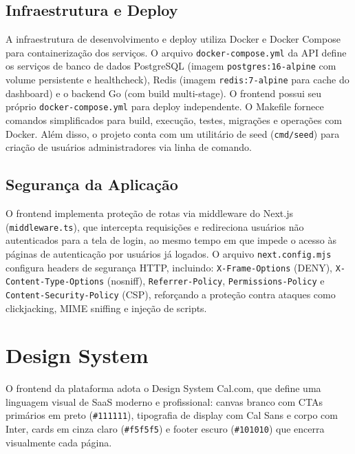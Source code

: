 \documentclass[a4paper,12pt,oneside]{article}
\begin{document}
\subsection{Infraestrutura e Deploy}

A infraestrutura de desenvolvimento e deploy utiliza Docker e Docker Compose para containerização dos serviços. O arquivo \texttt{docker-compose.yml} da API define os serviços de banco de dados PostgreSQL (imagem \texttt{postgres:16-alpine} com volume persistente e healthcheck), Redis (imagem \texttt{redis:7-alpine} para cache do dashboard) e o backend Go (com build multi-stage). O frontend possui seu próprio \texttt{docker-compose.yml} para deploy independente. O Makefile fornece comandos simplificados para build, execução, testes, migrações e operações com Docker. Além disso, o projeto conta com um utilitário de seed (\texttt{cmd/seed}) para criação de usuários administradores via linha de comando.

\subsection{Segurança da Aplicação}

O frontend implementa proteção de rotas via middleware do Next.js (\texttt{middleware.ts}), que intercepta requisições e redireciona usuários não autenticados para a tela de login, ao mesmo tempo em que impede o acesso às páginas de autenticação por usuários já logados. O arquivo \texttt{next.config.mjs} configura headers de segurança HTTP, incluindo: \texttt{X-Frame-Options} (DENY), \texttt{X-Content-Type-Options} (nosniff), \texttt{Referrer-Policy}, \texttt{Permissions-Policy} e \texttt{Content-Security-Policy} (CSP), reforçando a proteção contra ataques como clickjacking, MIME sniffing e injeção de scripts.

\section{Design System}

O frontend da plataforma adota o Design System Cal.com, que define uma linguagem visual de SaaS moderno e profissional: canvas branco com CTAs primários em preto (\texttt{\#111111}), tipografia de display com Cal Sans e corpo com Inter, cards em cinza claro (\texttt{\#f5f5f5}) e footer escuro (\texttt{\#101010}) que encerra visualmente cada página.
\end{document}
